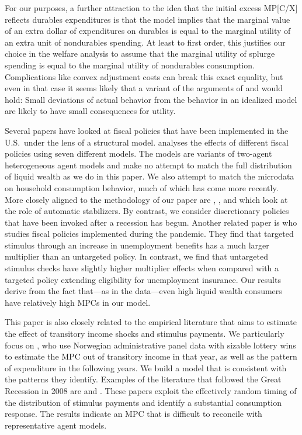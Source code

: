 \documentclass[\econtexRoot/HAFiscal]{subfiles}
\begin{document}
For our purposes, a further attraction to the idea that the initial excess MP[C/X] reflects durables expenditures is that the \cite{mankiw:durgoods} model implies that the marginal value of an extra dollar of expenditures on durables is equal to the marginal utility of an extra unit of nondurables spending. At least to first order, this justifies our choice in the welfare analysis to assume that the marginal utility of splurge spending is equal to the marginal utility of nondurables consumption.  Complications like convex adjustment costs can break this exact equality, but even in that case it seems likely that a variant of the arguments of \cite{akerlof1985near} and \cite{cochrane1989sensitivity} would hold: Small deviations of actual behavior from the behavior in an idealized model are likely to have small consequences for utility.

Several papers have looked at fiscal policies that have been implemented in the U.S.\ under the lens of a structural model. \cite{coenen2012effects} analyses the effects of different fiscal policies using seven different models. The models are variants of two-agent heterogeneous agent models and make no attempt to match the full distribution of liquid wealth as we do in this paper. We also attempt to match the microdata on household consumption behavior, much of which has come more recently.  More closely aligned to the methodology of our paper are \cite{mckay2016role}, \cite{mckay2021optimal}, and \cite{phan2024welfare} which look at the role of automatic stabilizers. By contrast, we consider discretionary policies that have been invoked after a recession has begun. Another related paper is \cite{bayercoronavirus} who studies fiscal policies implemented during the pandemic. They find that targeted stimulus through an increase in unemployment benefits has a much larger multiplier than an untargeted policy. In contrast, we find that untargeted stimulus checks have slightly higher multiplier effects when compared with a targeted policy extending eligibility for unemployment insurance. Our results derive from the fact that---as in the data---even high liquid wealth consumers have relatively high MPCs in our model.

This paper is also closely related to the empirical literature that aims to estimate the effect of transitory income shocks and stimulus payments. We particularly focus on \cite{fagereng_mpc_2021}, who use Norwegian administrative panel data with sizable lottery wins to estimate the MPC out of transitory income in that year, as well as the pattern of expenditure in the following years. We build a model that is consistent with the patterns they identify. Examples of the literature that followed the Great Recession in 2008 are \cite{parker2013consumer} and \cite{broda2014economic}. These papers exploit the effectively random timing of the distribution of stimulus payments and identify a substantial consumption response. The results indicate an MPC that is difficult to reconcile with representative agent models.
\end{document}

